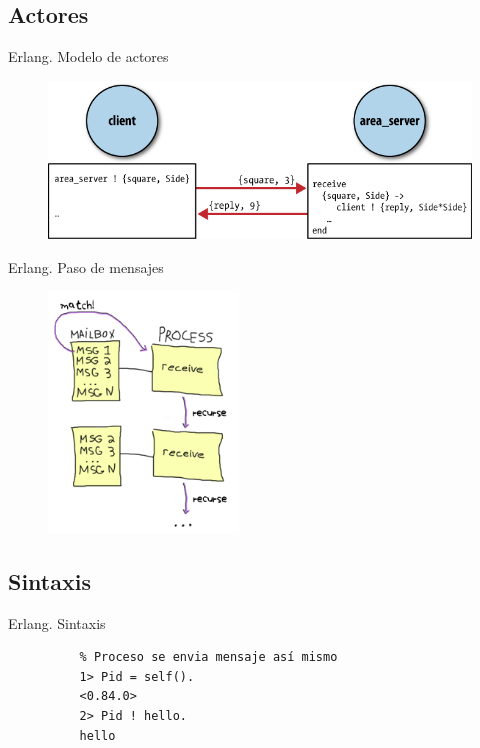 \documentclass{beamer}
\begin{document}
      \subsection{Actores}
      \begin{frame}{Erlang. Modelo de actores}
        \begin{figure}
          \includegraphics{actor-modelling.png}
        \end{figure}
      \end{frame}

      \begin{frame}{Erlang. Paso de mensajes}
        \begin{figure}
          \includegraphics[width=0.45\textwidth]{msg-match.png}
        \end{figure}
      \end{frame}

      \subsection{Sintaxis}
      \begin{frame}[fragile]{Erlang. Sintaxis}
        \begin{verbatim}
          % Proceso se envia mensaje así mismo
          1> Pid = self().
          <0.84.0>
          2> Pid ! hello.
          hello
        \end{verbatim}
      \end{frame}
\end{document}
